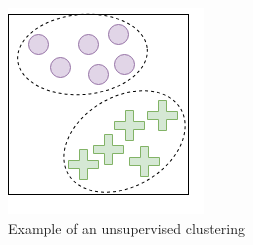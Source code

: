 
 \begin{figure}
     \centering
     \begin{subfigure}[b]{0.359\textwidth}
         \centering
         \includegraphics[width=\textwidth]{background/figures/unsupervised_clustering.png}
         \caption{Example of an unsupervised clustering}
         \label{fig:supervised_calssification}
     \end{subfigure}
     \hspace{15px}
     \begin{subfigure}[b]{0.34\textwidth}
         \centering

\end{subfigure}
\end{figure}
